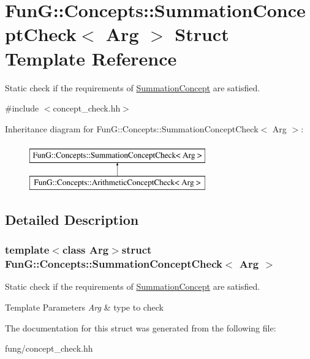 \hypertarget{structFunG_1_1Concepts_1_1SummationConceptCheck}{\section{Fun\-G\-:\-:Concepts\-:\-:Summation\-Concept\-Check$<$ Arg $>$ Struct Template Reference}
\label{structFunG_1_1Concepts_1_1SummationConceptCheck}
}


Static check if the requirements of \hyperlink{structFunG_1_1Concepts_1_1SummationConcept}{Summation\-Concept} are satisfied.  




{\ttfamily \#include $<$concept\-\_\-check.\-hh$>$}

Inheritance diagram for Fun\-G\-:\-:Concepts\-:\-:Summation\-Concept\-Check$<$ Arg $>$\-:\begin{figure}[H]
\begin{center}
\leavevmode
\includegraphics[height=2.000000cm]{structFunG_1_1Concepts_1_1SummationConceptCheck}
\end{center}
\end{figure}


\subsection{Detailed Description}
\subsubsection*{template$<$class Arg$>$struct Fun\-G\-::\-Concepts\-::\-Summation\-Concept\-Check$<$ Arg $>$}

Static check if the requirements of \hyperlink{structFunG_1_1Concepts_1_1SummationConcept}{Summation\-Concept} are satisfied. 


\begin{DoxyTemplParams}{Template Parameters}
{\em Arg} & type to check \\
\hline
\end{DoxyTemplParams}


The documentation for this struct was generated from the following file\-:\begin{DoxyCompactItemize}
\item 
fung/concept\-\_\-check.\-hh\end{DoxyCompactItemize}
